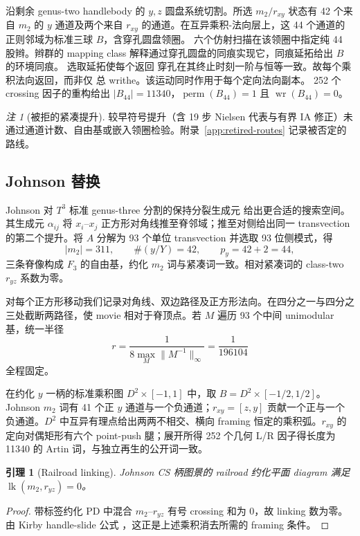 \documentclass[11pt]{amsart}
\newtheorem{lemma}[theorem]{引理}
\theoremstyle{definition}
\theoremstyle{remark}
\newtheorem{remark}[theorem]{注}
\begin{document}
沿剩余 genus-two handlebody 的 $y,z$ 圆盘系统切割。所选
$m_2/r_{xy}$ 状态有 42 个来自 $m_2$ 的 $y$ 通道及两个来自
$r_{xy}$ 的通道。在互异乘积-法向层上，这 44 个通道的正则邻域为标准三球 $B$，含穿孔圆盘领圈。
六个仿射扫描在该领圈中指定纯 44 股辫。辫群的 mapping class 解释通过穿孔圆盘的同痕实现它，同痕延拓给出 $B$ 的环境同痕。
选取延拓使每个返回
穿孔在其终止时刻一阶与恒等一致。故每个乘积法向返回，而非仅
总 writhe。该运动同时作用于每个定向法向副本。
252 个 crossing 因子的重构给出
$|B_{44}|=11340$，$\operatorname{perm}(B_{44})=1$ 且
$\operatorname{wr}(B_{44})=0$。

\begin{remark}[被拒的紧凑提升]
较早符号提升（含 19 步 Nielsen 代表与有界 IA 修正）未通过通道计数、自由基或嵌入领圈检验。附录~\ref{app:retired-routes} 记录被否定的路线。
\end{remark}

\subsection{Johnson 替换}

Johnson 对 $T^3$ 标准 genus-three 分割的保持分裂生成元
\cite{Johnson2011} 给出更合适的搜索空间。其生成元
$\alpha_{ij}$ 将 $x_i$--$x_j$ 正方形对角线推至脊邻域；推至对侧给出同一 transvection 的第二个提升。将 $A$ 分解为 93 个单位 transvection 并选取 93 位侧模式，得
\[
|m_2|=311,\qquad \#(y/Y)=42,\qquad p_y=42+2=44,
\]
三条脊像构成 $F_3$ 的自由基，约化 $m_2$ 词与紧凑词一致。相对紧凑词的 class-two $r_{yz}$ 系数为零。

对每个正方形移动我们记录对角线、双边路径及正方形法向。在四分之一与四分之三处截断两路径，使 movie 相对于脊顶点。若 $M$ 遍历 93 个中间 unimodular 基，统一半径
\[
r=\frac{1}{8\max_M\lVert M^{-1}\rVert_\infty}=\frac1{196104}
\]
全程固定。

在约化 $y$ 一柄的标准乘积图 $D^2\times[-1,1]$ 中，取 $B=D^2\times[-1/2,1/2]$。Johnson $m_2$ 词有 41 个正 $y$ 通道与一个负通道；$r_{xy}=[z,y]$ 贡献一个正与一个负通道。$D^2$ 中互异有理点给出两两不相交、横向 framing 恒定的乘积弧。$r_{xy}$ 的定向对偶矩形有六个 point-push 腿；展开所得 252 个几何 L/R 因子得长度为 11340 的 Artin 词，与独立再生的公开词一致。

\begin{lemma}[Railroad linking]\label{lem:P0d-link}
Johnson CS 柄图景的 railroad 约化平面 diagram 满足
$\operatorname{lk}(m_2,r_{yz})=0$。
\end{lemma}

\begin{proof}
带标签约化 PD 中混合 $m_2$--$r_{yz}$ 有号 crossing 和为
$0$，故 linking 数为零。由 Kirby handle-slide 公式
\cite{Kirby1978}，这正是上述乘积消去所需的 framing 条件。
\end{proof}
\end{document}
